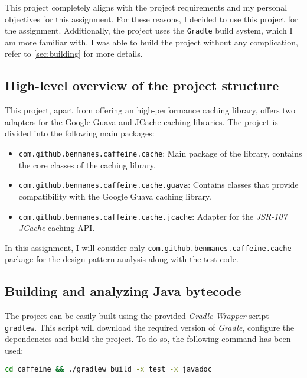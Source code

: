 \documentclass[a4paper, 11pt]{article}
\begin{document}
\begin{itemize}
    This project completely aligns with the project requirements and my personal objectives for this assignment. For these reasons, I decided to use this project for the assignment. Additionally, the project uses the \texttt{Gradle} build system, which I am more familiar with. I was able to build the project without any complication, refer to \autoref{sec:building} for more details.

\end{itemize}

\subsection{High-level overview of the project structure}

This project, apart from offering an high-performance caching library, offers two adapters for the Google Guava and JCache caching libraries. The project is divided into the following main packages:

\begin{itemize}
	\item \texttt{com.github.benmanes.caffeine.cache}: Main package of the library, contains the core classes of the caching library.
  \item \texttt{com.github.benmanes.caffeine.cache.guava}: Contains classes that provide compatibility with the Google Guava caching library. \cite{caffeine:guava}
  \item \texttt{com.github.benmanes.caffeine.cache.jcache}: Adapter for the \textit{JSR-107 JCache} caching API. \cite{caffeine:jcache}
\end{itemize}

In this assignment, I will consider only \texttt{com.github.benmanes.caffeine.cache} package for the design pattern analysis along with the test code.

\subsection{Building and analyzing Java bytecode}
\label{sec:building}

The project can be easily built using the provided \textit{Gradle Wrapper} script \texttt{gradlew}. This script will download the required version of \textit{Gradle}, configure the dependencies and build the project. To do so, the following command has been used:

\begin{lstlisting}[language=bash, caption={Building the Caffeine project with Gradle}]
              cd caffeine && ./gradlew build -x test -x javadoc
\end{lstlisting}
\end{document}
